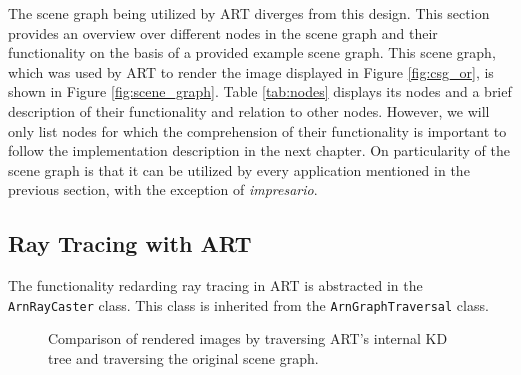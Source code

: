 The scene graph being utilized by ART diverges from this design. This section provides an overview over different nodes in the scene graph and their functionality on the basis of a provided example scene graph. This scene graph, which was used by ART to render the image displayed in Figure \ref{fig:csg_or}, is shown in Figure \ref{fig:scene_graph}. Table \ref{tab:nodes} displays its nodes and a brief description of their functionality and relation to other nodes. However, we will only list nodes for which the comprehension of their functionality is important to follow the implementation description in the next chapter.
On particularity of the scene graph is that it can be utilized by every application mentioned in the previous section, with the exception of \emph{impresario}.

\subsection{Ray Tracing with ART}
\label{sec:art_raytracing}
The functionality redarding ray tracing in ART is abstracted in the \texttt{ArnRayCaster} class. This class is inherited from the \texttt{ArnGraphTraversal} class. 




\begin{figure}[!tbp]
	\centering
	\hfill
	\caption{Comparison of rendered images by traversing ART's internal KD tree and traversing the original scene graph.}
	\label{fig:org_scenegraph}
\end{figure}

